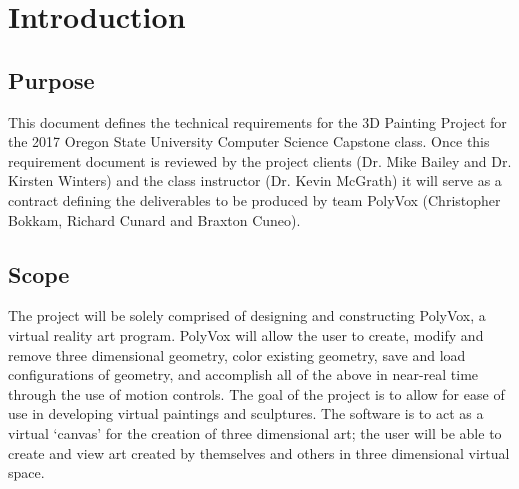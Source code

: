 \documentclass[onecolumn, draftclsnofoot,10pt, compsoc]{IEEEtran}
\begin{document}
\section{Introduction}
\subsection{Purpose}
This document defines the technical requirements for the 3D Painting Project for the 2017 Oregon State University Computer Science Capstone class. Once this requirement document is reviewed by the project clients (Dr. Mike Bailey and Dr. Kirsten Winters) and the class instructor (Dr. Kevin McGrath) it will serve as a contract defining the deliverables to be produced by team PolyVox (Christopher Bokkam, Richard Cunard and Braxton Cuneo).
\subsection{Scope}
The project will be solely comprised of designing and constructing PolyVox, a virtual reality art program. PolyVox will allow the user to create, modify and remove three dimensional geometry, color existing geometry, save and load configurations of geometry, and accomplish all of the above in near-real time through the use of motion controls. The goal of the project is to allow for ease of use in developing virtual paintings and sculptures. The software is to act as a virtual ‘canvas’ for the creation of three dimensional art; the user will be able to create and view art created by themselves and others in three dimensional virtual space. 
\end{document}
